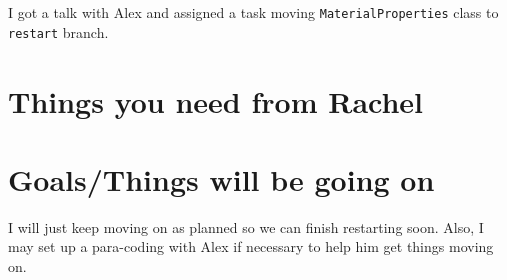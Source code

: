 \documentclass{article}
\begin{document}
I got a talk with Alex and assigned a task moving {\tt MaterialProperties} class to {\tt restart} branch.
\section{Things you need from Rachel}


\section{Goals/Things will be going on}
I will just keep moving on as planned so we can finish restarting soon. Also, I may set up a para-coding with Alex if necessary to help him get things moving on.





%
%
%

\end{document}
